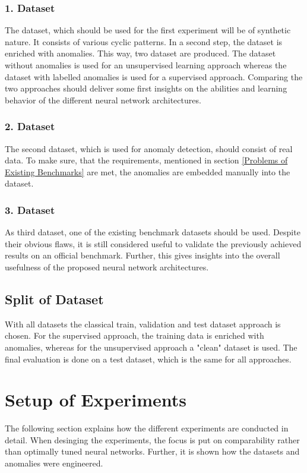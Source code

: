 \subsubsection{1. Dataset}
The dataset, which should be used for the first experiment will be of synthetic nature. It consists of various cyclic patterns. In a second step, the dataset is enriched with anomalies. This way, two dataset are produced. The dataset without anomalies is used for an unsupervised learning approach whereas the dataset with labelled anomalies is used for a supervised approach. Comparing the two approaches should deliver some first insights on the abilities and learning behavior of the different neural network architectures.   

\subsubsection{2. Dataset}
The second dataset, which is used for anomaly detection, should consist of real data. To make sure, that the requirements, mentioned in section \ref{Problems of Existing Benchmarks} are met, the anomalies are embedded manually into the dataset. 

\subsubsection{3. Dataset}
As third dataset, one of the existing benchmark datasets should be used. Despite their obvious flaws, it is still considered useful to validate the previously achieved results on an official benchmark. Further, this gives insights into the overall usefulness of the proposed neural network architectures.

\subsection{Split of Dataset}
With all datasets the classical train, validation and test dataset approach is chosen. For the supervised approach, the training data is enriched with anomalies, whereas for the unsupervised approach a "clean" dataset is used. The final evaluation is done on a test dataset, which is the same for all approaches.


\section{Setup of Experiments}
The following section explains how the different experiments are conducted in detail. When desinging the experiments, the focus is put on comparability rather than optimally tuned neural networks.  Further, it is shown how the datasets and anomalies were engineered.

